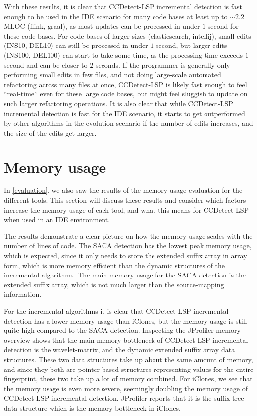 With these results, it is clear that CCDetect-LSP incremental detection is fast enough to
be used in the IDE scenario for many code bases at least up to ${\sim}2.2$MLOC (flink,
graal), as most updates can be processed in under $1$ second for these code bases. For
code bases of larger sizes (elasticsearch, intellij), small edits (INS10, DEL10) can still
be processed in under $1$ second, but larger edits (INS100, DEL100) can start to take some
time, as the processing time exceeds $1$ second and can be closer to $2$ seconds. If the
programmer is generally only performing small edits in few files, and not doing
large-scale automated refactoring across many files at once, CCDetect-LSP is likely fast
enough to feel ``real-time'' even for these large code bases, but might feel sluggish to
update on such larger refactoring operations. It is also clear that while CCDetect-LSP
incremental detection is fast for the IDE scenario, it starts to get outperformed by other
algorithms in the evolution scenario if the number of edits increases, and the size of the
edits get larger.

\section{Memory usage}

In \cref{evaluation}, we also saw the results of the memory usage evaluation for the
different tools. This section will discuss these results and consider which factors
increase the memory usage of each tool, and what this means for CCDetect-LSP when used in
an IDE environment.

The results demonstrate a clear picture on how the memory usage scales with the number of
lines of code. The SACA detection has the lowest peak memory usage, which is expected,
since it only needs to store the extended suffix array in array form, which is more memory
efficient than the dynamic structures of the incremental algorithms. The main memory usage
for the SACA detection is the extended suffix array, which is not much larger than the
source-mapping information.

For the incremental algorithms it is clear that CCDetect-LSP incremental detection has a
lower memory usage than iClones, but the memory usage is still quite high compared to the
SACA detection. Inspecting the JProfiler memory overview shows that the main memory
bottleneck of CCDetect-LSP incremental detection is the wavelet-matrix, and the dynamic
extended suffix array data structures. These two data structures take up about the same
amount of memory, and since they both are pointer-based structures representing values for
the entire fingerprint, these two take up a lot of memory combined. For iClones, we see
that the memory usage is even more severe, seemingly doubling the memory usage of
CCDetect-LSP incremental detection. JProfiler reports that it is the suffix tree data
structure which is the memory bottleneck in iClones. 

